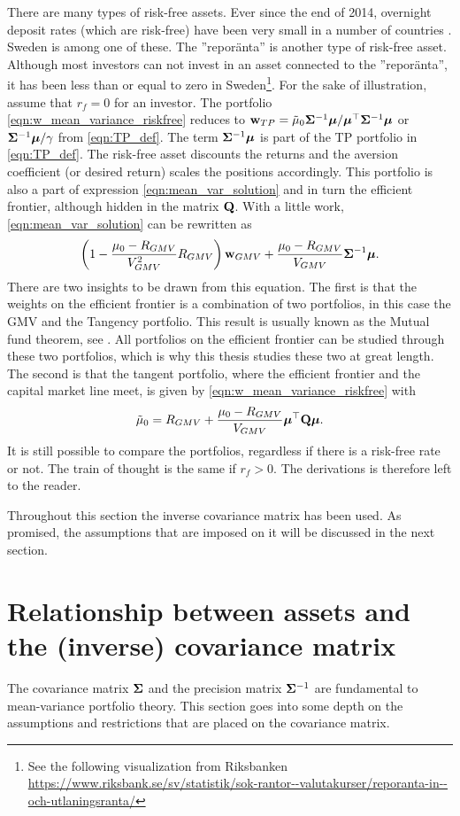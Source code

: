 \documentclass[12pt, oneside]{book}\usepackage{knitr}
\begin{document}
There are many types of risk-free assets.
Ever since the end of 2014, overnight deposit rates (which are risk-free) have been very small in a number of countries \citep[see, e.g., ]{lopez2020have}.
Sweden is among one of these. 
The ''reporänta'' is another type of risk-free asset. 
Although most investors can not invest in an asset connected to the ''reporänta'', it has been less than or equal to zero in Sweden\footnote{See the following visualization from Riksbanken \url{https://www.riksbank.se/sv/statistik/sok-rantor--valutakurser/reporanta-in--och-utlaningsranta/}}.
For the sake of illustration, assume that $r_f=0$ for an investor.
The portfolio \eqref{eqn:w_mean_variance_riskfree} reduces to $\mathbf{w}_{TP} = \tilde\mu_0 \mathbf{\Sigma}^{-1} \mbox{\boldmath$\mu$} / \mbox{\boldmath$\mu$}^\top \mathbf{\Sigma}^{-1} \mbox{\boldmath$\mu$}$ or $\mathbf{\Sigma}^{-1}\mbox{\boldmath$\mu$} / \gamma$ from \eqref{eqn:TP_def}. 
The term $\mathbf{\Sigma}^{-1} \mbox{\boldmath$\mu$}$ is part of the TP portfolio in \eqref{eqn:TP_def}. 
The risk-free asset discounts the returns and the aversion coefficient (or desired return) scales the positions accordingly.
This portfolio is also a part of expression \eqref{eqn:mean_var_solution} and in turn the efficient frontier, although hidden in the matrix $\mathbf{Q}$. 
With a little work, \eqref{eqn:mean_var_solution} can be rewritten as
$$
\left(1 - \frac{\mu_0-R_{GMV}}{V_{GMV}^2} R_{GMV} \right) \mathbf{w}_{GMV} + \frac{\mu_0-R_{GMV}}{V_{GMV}} \mathbf{\Sigma}^{-1} \mbox{\boldmath$\mu$}.
$$
There are two insights to be drawn from this equation.
The first is that the weights on the efficient frontier is a combination of two portfolios, in this case the GMV and the Tangency portfolio. 
This result is usually known as the Mutual fund theorem, see \citet{tobin1958liquidity}.
All portfolios on the efficient frontier can be studied through these two portfolios, which is why this thesis studies these two at great length.
The second is that the tangent portfolio, where the efficient frontier and the capital market line meet, is given by \eqref{eqn:w_mean_variance_riskfree} with 
$$
\tilde\mu_0 = R_{GMV} + \frac{\mu_0-R_{GMV}}{V_{GMV}} \mbox{\boldmath$\mu$}^\top \mathbf{Q} \mbox{\boldmath$\mu$}.
$$
It is still possible to compare the portfolios, regardless if there is a risk-free rate or not.
The train of thought is the same if $r_f>0$.
The derivations is therefore left to the reader.

Throughout this section the inverse covariance matrix has been used.
As promised, the assumptions that are imposed on it will be discussed in the next section.

\section{Relationship between assets and the (inverse) covariance matrix}\label{sec:cov_prec_matrix}
The covariance matrix $\mathbf{\Sigma}$ and the precision matrix $\mathbf{\Sigma}^{-1}$ are fundamental to mean-variance portfolio theory. 
This section goes into some depth on the assumptions and restrictions that are placed on the covariance matrix.
\end{document}
